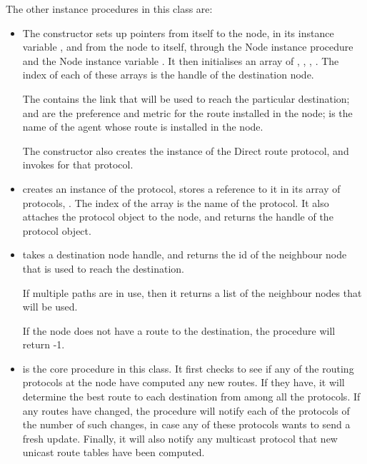 The other instance procedures in this class are:
\begin{itemize}
\item {}
The constructor sets up pointers from itself to the node,
in its instance variable , and from the node to itself,
through the Node instance procedure
 and the Node instance variable .
It then initialises an array of
, , , .
The index of each of these arrays is the handle of the destination node.

The  contains the link that will be used to reach the
particular destination;
 and  are
the preference and metric for the route installed in the node;
 is the name of the agent whose route is installed in the node.

The constructor also creates the instance of the Direct route protocol,
and invokes  for that protocol.

\item
{}
creates an instance of the protocol, stores a reference to it
in its array of protocols, .
The index of the array is the name of the protocol.
It also attaches the protocol object to the node,
and returns the handle of the protocol object.

\item {}
takes a destination node handle, and returns the id of the neighbour node
that is used to reach the destination.

If multiple paths are in use, then it returns a list of the
neighbour nodes that will be used.

If the node does not have a route to the destination,
the procedure will return -1.

\item
{}
is the core procedure in this class.
It first checks to see if any of the routing protocols
at the node have computed any new routes.
If they have,
it will determine the best route to each destination
from among all the protocols.
If any routes have changed,
the procedure will notify each of the protocols of the number of
such changes, in case any of these protocols wants to send a fresh update.
Finally, it will also notify any multicast protocol that new unicast route
tables have been computed.


\end{itemize}
